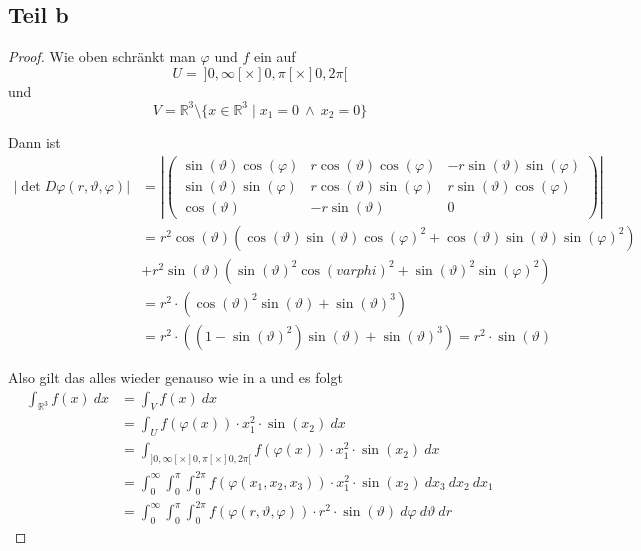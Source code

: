 \documentclass[10pt,a4paper]{article}
\begin{document}
\subsection{Teil b}
\begin{proof}
  Wie oben schränkt man $\varphi$ und $f$ ein auf
  \begin{equation}
    U =\ ]0, \infty[ \times ]0, \pi[ \times ]0, 2\pi[
  \end{equation}
  und
  \begin{equation}
    V = \mathbb{R}^{3} \setminus \{ x \in \mathbb{R}^{3} \mid x_{1} = 0\ \land\ x_{2} = 0 \}
  \end{equation}

  Dann ist
  \begin{align*}
    |\det D\varphi(r, \vartheta, \varphi)| & = \left|
      \begin{pmatrix}
        \sin(\vartheta) \cos(\varphi) & r \cos(\vartheta) \cos(\varphi) & -r \sin(\vartheta) \sin(\varphi)\\
        \sin(\vartheta) \sin(\varphi) & r \cos(\vartheta) \sin(\varphi) & r \sin(\vartheta) \cos(\varphi)\\
        \cos(\vartheta) & -r \sin(\vartheta) & 0
      \end{pmatrix}
    \right|\\
    & = r^{2} \cos(\vartheta) \left( \cos(\vartheta) \sin(\vartheta) \cos(\varphi)^{2} + \cos(\vartheta) \sin(\vartheta) \sin(\varphi)^{2} \right)\\
    & + r^{2} \sin(\vartheta) \left( \sin(\vartheta)^{2} \cos(varphi)^{2} + \sin(\vartheta)^{2} \sin(\varphi)^{2} \right)\\
    & = r^{2} \cdot \left( \cos(\vartheta)^{2} \sin(\vartheta) + \sin(\vartheta)^{3} \right)\\
    & = r^{2} \cdot \left( (1 - \sin(\vartheta)^{2}) \sin(\vartheta) + \sin(\vartheta)^{3} \right) = r^{2} \cdot \sin(\vartheta)
  \end{align*}

  Also gilt das alles wieder genauso wie in a und es folgt
  \begin{align*}
    \int_{\mathbb{R}^{3}} f(x)\ dx & = \int_{V} f(x)\ dx\\
    & = \int_{U} f(\varphi(x)) \cdot x_{1}^{2} \cdot \sin(x_{2})\ dx\\
    & = \int_{]0, \infty[ \times ]0, \pi[ \times ]0, 2\pi[} f(\varphi(x)) \cdot x_{1}^{2} \cdot \sin(x_{2})\ dx\\
    & = \int_{0}^{\infty} \int_{0}^{\pi} \int_{0}^{2\pi} f(\varphi(x_{1}, x_{2}, x_{3})) \cdot x_{1}^{2} \cdot \sin(x_{2})\ dx_{3}\ dx_{2}\ dx_{1}\\
    & = \int_{0}^{\infty} \int_{0}^{\pi} \int_{0}^{2\pi} f(\varphi(r, \vartheta, \varphi)) \cdot r^{2} \cdot \sin(\vartheta)\ d\varphi\ d\vartheta\ dr
  \end{align*}
\end{proof}
\end{document}
